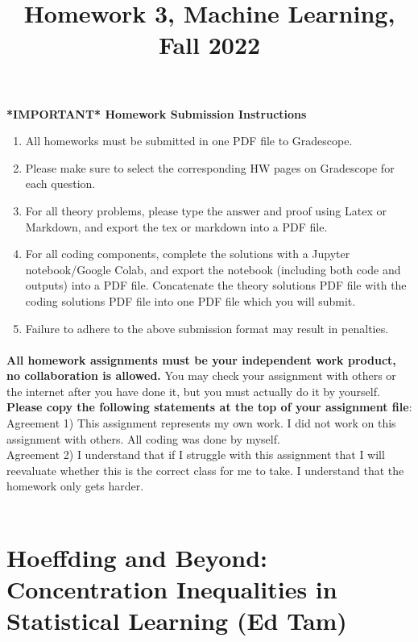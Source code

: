 \documentclass{exam}
\title{Homework 3, Machine Learning, Fall 2022}
\author{ }
\date{}
\begin{document}
\maketitle
\textbf{*IMPORTANT* Homework Submission Instructions}
\begin{enumerate}
    \item All homeworks must be submitted in one PDF file to Gradescope. 
    \item Please make sure to select the corresponding HW pages on Gradescope for each question.
    \item For all theory problems, please type the answer and proof using Latex or Markdown, and export the tex or markdown into a PDF file. 
    \item For all coding components, complete the solutions with a Jupyter notebook/Google Colab, and export the notebook (including both code and outputs) into a PDF file. Concatenate the theory solutions PDF file with the coding solutions PDF file into one PDF file which you will submit. 
    \item Failure to adhere to the above submission format may result in penalties.  
\end{enumerate}


\paragraph{} \textbf{All homework assignments must be your independent work product, no collaboration is allowed.} You may check your assignment with others or the internet after you have done it, but you must actually do it by yourself. \textbf{Please copy the following statements at the top of your assignment file}: \\

Agreement 1) This assignment represents my own work. I did not work on this assignment with others. All coding was done by myself. \\

Agreement 2) I understand that if I struggle with this assignment that I will reevaluate whether this is the correct class for me to take. I understand that the homework only gets harder.\\\\

\vspace{4in}

\newpage
\section{Hoeffding and Beyond: Concentration Inequalities in Statistical Learning (Ed Tam)}
\end{document}
